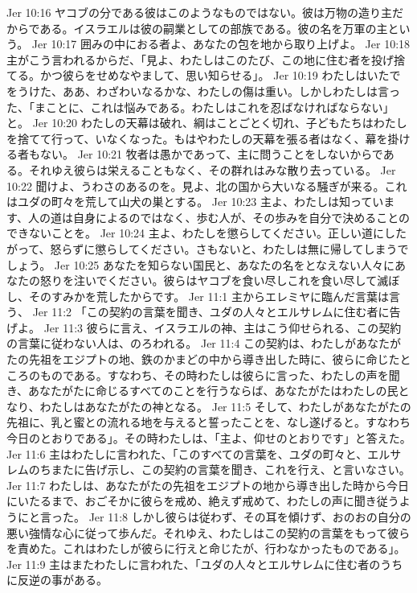 Jer 10:16  ヤコブの分である彼はこのようなものではない。彼は万物の造り主だからである。イスラエルは彼の嗣業としての部族である。彼の名を万軍の主という。
Jer 10:17  囲みの中におる者よ、あなたの包を地から取り上げよ。
Jer 10:18  主がこう言われるからだ、「見よ、わたしはこのたび、この地に住む者を投げ捨てる。かつ彼らをせめなやまして、思い知らせる」。
Jer 10:19  わたしはいたでをうけた、ああ、わざわいなるかな、わたしの傷は重い。しかしわたしは言った、「まことに、これは悩みである。わたしはこれを忍ばなければならない」と。
Jer 10:20  わたしの天幕は破れ、綱はことごとく切れ、子どもたちはわたしを捨てて行って、いなくなった。もはやわたしの天幕を張る者はなく、幕を掛ける者もない。
Jer 10:21  牧者は愚かであって、主に問うことをしないからである。それゆえ彼らは栄えることもなく、その群れはみな散り去っている。
Jer 10:22  聞けよ、うわさのあるのを。見よ、北の国から大いなる騒ぎが来る。これはユダの町々を荒して山犬の巣とする。
Jer 10:23  主よ、わたしは知っています、人の道は自身によるのではなく、歩む人が、その歩みを自分で決めることのできないことを。
Jer 10:24  主よ、わたしを懲らしてください。正しい道にしたがって、怒らずに懲らしてください。さもないと、わたしは無に帰してしまうでしょう。
Jer 10:25  あなたを知らない国民と、あなたの名をとなえない人々にあなたの怒りを注いでください。彼らはヤコブを食い尽しこれを食い尽して滅ぼし、そのすみかを荒したからです。
Jer 11:1  主からエレミヤに臨んだ言葉は言う、
Jer 11:2  「この契約の言葉を聞き、ユダの人々とエルサレムに住む者に告げよ。
Jer 11:3  彼らに言え、イスラエルの神、主はこう仰せられる、この契約の言葉に従わない人は、のろわれる。
Jer 11:4  この契約は、わたしがあなたがたの先祖をエジプトの地、鉄のかまどの中から導き出した時に、彼らに命じたところのものである。すなわち、その時わたしは彼らに言った、わたしの声を聞き、あなたがたに命じるすべてのことを行うならば、あなたがたはわたしの民となり、わたしはあなたがたの神となる。
Jer 11:5  そして、わたしがあなたがたの先祖に、乳と蜜との流れる地を与えると誓ったことを、なし遂げると。すなわち今日のとおりである」。その時わたしは、「主よ、仰せのとおりです」と答えた。
Jer 11:6  主はわたしに言われた、「このすべての言葉を、ユダの町々と、エルサレムのちまたに告げ示し、この契約の言葉を聞き、これを行え、と言いなさい。
Jer 11:7  わたしは、あなたがたの先祖をエジプトの地から導き出した時から今日にいたるまで、おごそかに彼らを戒め、絶えず戒めて、わたしの声に聞き従うようにと言った。
Jer 11:8  しかし彼らは従わず、その耳を傾けず、おのおの自分の悪い強情な心に従って歩んだ。それゆえ、わたしはこの契約の言葉をもって彼らを責めた。これはわたしが彼らに行えと命じたが、行わなかったものである」。
Jer 11:9  主はまたわたしに言われた、「ユダの人々とエルサレムに住む者のうちに反逆の事がある。
